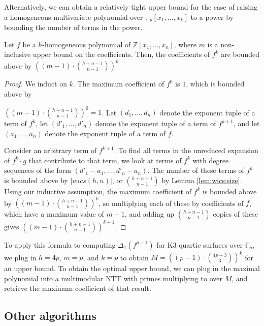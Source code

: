 Alternatively, we can obtain a relatively tight upper bound for the case of raising a homogeneous multivariate polynomial over $\mathbb{F}_p[x_1, \dots , x_k]$ to a power
by bounding the number of terms in the power. 

\begin{thm}
    Let $f$ be a $h$-homogeneous polynomial of $\mathbb{Z}[x_1, \dots, x_n]$, where $m$ is a non-inclusive upper bound on the coefficients. Then, the coefficients of $f ^ k$ are bounded above by $\left((m - 1) \cdot \binom{h + n - 1}{n - 1}\right)^ k$
\end{thm}

\begin{proof}
    We induct on $k$. The maximum coefficient of $f^0$ is $1$, which is bounded above by 
    
    \noindent$\left((m - 1) \cdot \binom{h + n - 1}{n - 1}\right)^ 0 = 1$.
    Let $(d_1, \dots , d_n)$ denote the exponent tuple of a term of $f^k$, let $(d'_1, \dots , d'_n)$ denote the exponent tuple of a term of $f^{k + 1}$, and let $(a_1, \dots , a_n)$ denote the exponent tuple of a term of $f$.

    Consider an arbitrary term of $f^{k + 1}$. To find all terms in the unreduced expansion of $f^k \cdot g$ that contribute to that term, we look at terms of $f^k$ with degree sequences of the form $(d'_1 - a_1, \dots , d'_n - a_n)$. The number of these terms of $f^k$ is bounded above by $|wics(h, n)|$, or $\binom{h + n - 1}{n - 1}$ by Lemma \ref{lem:wics:size}. Using our inductive assumption, the maximum coefficient of $f^k$ is bounded above by $\left((m - 1) \cdot \binom{h + n - 1}{n - 1}\right)^ k$, so multiplying each of these by coefficients of $f$, which have a maximum value of $m - 1$, and adding up $\binom{h + n - 1}{n - 1}$ copies of these gives $\left((m - 1) \cdot \binom{h + n - 1}{n - 1}\right)^{k + 1}$.
\end{proof}

To apply this formula to computing $\Delta_1(f^{p - 1})$ for K3 
quartic surfaces over $\mathbb{F}_p$, we plug in $h = 4p$, $m = p$, 
and $k = p$ to obtain $M = \left((p - 1) \cdot \binom{4p + 3}{3}\right)^ k$
for an upper bound. To obtain the optimal upper bound, we can plug in the
maximal polynomial into a multimodular NTT with primes multiplying to over $M$,
and retrieve the maximum coefficient of that result.

\subsection{Other algorithms} \label{sec:poly:other}

